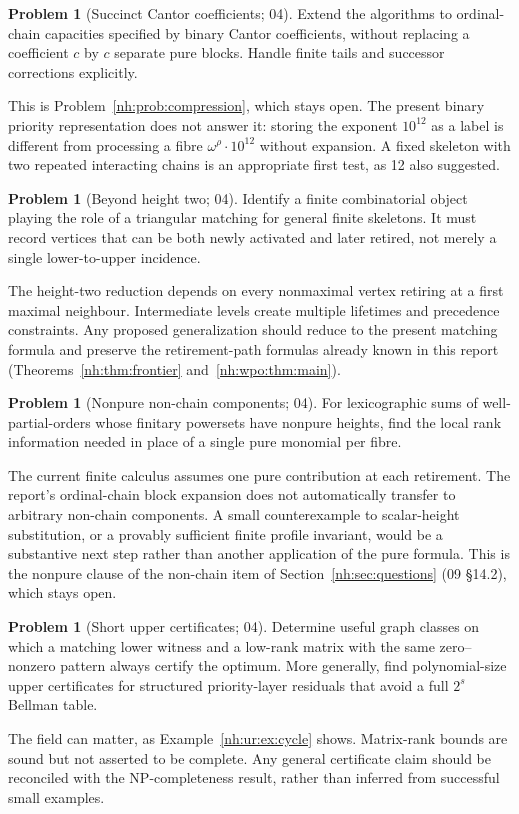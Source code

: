 \documentclass[11pt,a4paper]{article}
\theoremstyle{definition}
\newtheorem{problem}[theorem]{Problem}
\theoremstyle{remark}
\begin{document}
\begin{problem}[Succinct Cantor coefficients; 04]\label{nh:ur:prob:succinct}
Extend the algorithms to ordinal-chain capacities specified by binary Cantor
coefficients, without replacing a coefficient $c$ by $c$ separate pure blocks.
Handle finite tails and successor corrections explicitly.
\end{problem}
This is Problem~\ref{nh:prob:compression}, which stays open. The present
binary priority representation does not answer it: storing the exponent
$10^{12}$ as a label is different from processing a fibre
$\omega^\rho\cdot10^{12}$ without expansion. A fixed skeleton with two
repeated interacting chains is an appropriate first test, as 12 also
suggested.

\begin{problem}[Beyond height two; 04]\label{nh:ur:prob:beyond}
Identify a finite combinatorial object playing the role of a triangular
matching for general finite skeletons. It must record vertices that can be
both newly activated and later retired, not merely a single lower-to-upper
incidence.
\end{problem}
The height-two reduction depends on every nonmaximal vertex retiring at a
first maximal neighbour. Intermediate levels create multiple lifetimes and
precedence constraints. Any proposed generalization should reduce to the
present matching formula and preserve the retirement-path formulas already
known in this report (Theorems~\ref{nh:thm:frontier}
and~\ref{nh:wpo:thm:main}).

\begin{problem}[Nonpure non-chain components; 04]\label{nh:ur:prob:nonpure}
For lexicographic sums of well-partial-orders whose finitary powersets have
nonpure heights, find the local rank information needed in place of a single
pure monomial per fibre.
\end{problem}
The current finite calculus assumes one pure contribution at each retirement.
The report's ordinal-chain block expansion does not automatically transfer to
arbitrary non-chain components. A small counterexample to scalar-height
substitution, or a provably sufficient finite profile invariant, would be a
substantive next step rather than another application of the pure formula.
This is the nonpure clause of the non-chain item of
Section~\ref{nh:sec:questions} (09 \S14.2), which stays open.

\begin{problem}[Short upper certificates; 04]\label{nh:ur:prob:certificates}
Determine useful graph classes on which a matching lower witness and a
low-rank matrix with the same zero--nonzero pattern always certify the
optimum. More generally, find polynomial-size upper certificates for
structured priority-layer residuals that avoid a full $2^s$ Bellman table.
\end{problem}
The field can matter, as Example~\ref{nh:ur:ex:cycle} shows. Matrix-rank
bounds are sound but not asserted to be complete. Any general certificate
claim should be reconciled with the NP-completeness result, rather than
inferred from successful small examples.
\end{document}
